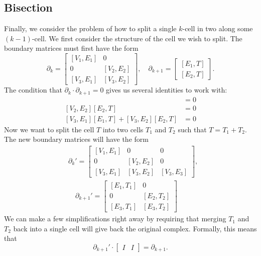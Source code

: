 \documentclass[twocolumn]{article}
\begin{document}
\subsection{Bisection}

Finally, we consider the problem of how to split a single $k$-cell in two along some $(k - 1)$-cell.
We first consider the structure of the cell we wish to split.
The boundary matrices must first have the form
\begin{equation}
    \partial_k = \left[\begin{matrix}[V_1, E_1] & 0 \\ 0 & [V_2, E_2] \\ [V_3, E_1] & [V_3, E_2]\end{matrix}\right], \quad \partial_{k + 1} = \left[\begin{matrix}[E_1, T] \\ [E_2, T]\end{matrix}\right].
\end{equation}
The condition that $\partial_k\cdot\partial_{k + 1} = 0$ gives us several identities to work with:
\begin{align}
    [V_1, E_1][E_1, T] & = 0 \\
    [V_2, E_2][E_2, T] & = 0 \\
    [V_3, E_1][E_1, T] + [V_3, E_2][E_2, T] & = 0 \label{eq:bisect-start}
\end{align}
Now we want to split the cell $T$ into two cells $T_1$ and $T_2$ such that $T = T_1 + T_2$.
The new boundary matrices will have the form
\begin{align}
    & \partial_k' = \left[\begin{matrix}[V_1, E_1] & 0 & 0 \\ 0 & [V_2, E_2] & 0 \\ [V_3, E_1] & [V_3, E_2] & [V_3, E_3] \end{matrix}\right], \\
    & \quad \partial_{k + 1}' = \left[\begin{matrix}[E_1, T_1] & 0 \\ 0 & [E_2, T_2] \\ [E_3, T_1] & [E_3, T_2]\end{matrix}\right]
\end{align}
We can make a few simplifications right away by requiring that merging $T_1$ and $T_2$ back into a single cell will give back the original complex.
Formally, this means that
\begin{equation}
    \partial_{k + 1}'\cdot\left[\begin{matrix} I & I\end{matrix}\right] = \partial_{k + 1}.
\end{equation}
\end{document}
